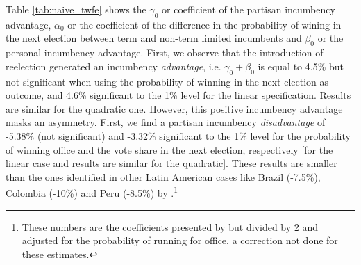 \documentclass[12pt]{amsart}
\makeatletter
\def\section{\@startsection{section}{1}
	\z@{1.0\linespacing\@plus\linespacing}{.5\linespacing}{\Large}}
\numberwithin{equation}{section}
\theoremstyle{definition}
\theoremstyle{definition}
\theoremstyle{definition}
\makeatother
\begin{document}
\section{Main Results \label{sec:results}}

Table \ref{tab:naive_twfe} shows the $\gamma_0$ or coefficient of the partisan incumbency advantage, $\alpha_0$ or the coefficient of the difference in the probability of wining in the next election between term and non-term limited incumbents and $\beta_0$ or the personal incumbency advantage. %
First, we observe that the introduction of reelection generated an incumbency \emph{advantage}, i.e. $\gamma_0 + \beta_0$ is equal to 4.5\% but not significant when using the probability of winning in the next election as outcome, and 4.6\% significant to the 1\% level for the linear specification. Results are similar for the quadratic one. However, this positive incumbency advantage masks an asymmetry. First, we find a partisan incumbency \emph{disadvantage} of -5.38\% (not significant) and -3.32\% significant to the 1\% level for the probability of winning office and the vote share in the next election, respectively [for the linear case and results are similar for the quadratic]. These results are smaller than the ones identified in other Latin American cases like Brazil (-7.5\%), Colombia (-10\%) and Peru (-8.5\%) by \citet{klasnja_titiunik_2017}.\footnote{These numbers are the coefficients presented by \citet{klasnja_titiunik_2017} but divided by 2 and adjusted for the probability of running for office, a correction not done for these estimates.} 

\begin{table}[h]\def\sym#1{\ifmmode^{#1}\else\(^{#1}\)\fi}
\centering
\caption{Partisan and Personal Incumbency Advantage, Difference-in-Discontinuity of Close Elections Model}
\label{tab:naive_twfe}
\end{table}    
\end{document}
